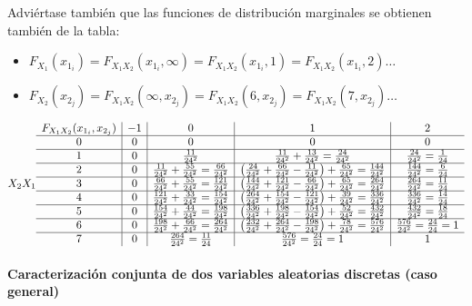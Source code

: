 \documentclass[11pt]{article}
\providecommand{\tightlist}{%
      \setlength{\itemsep}{0pt}\setlength{\parskip}{0pt}}
\begin{document}
Adviértase también que las funciones de distribución marginales se
obtienen también de la tabla:

\begin{itemize}
\tightlist
\item
  \(F_{X_1}(x_{1_i}) = F_{X_1X_2}(x_{1_i}, \infty) = F_{X_1X_2}(x_{1_i}, 1) = F_{X_1X_2}(x_{1_i}, 2)\ldots\)
\item
  \(F_{X_2}(x_{2_j}) = F_{X_1X_2}(\infty, x_{2_j}) = F_{X_1X_2}(6, x_{2_j}) = F_{X_1X_2}(7, x_{2_j})\ldots\)
\end{itemize}

    \[
X_2 \\X_1 \begin{array}{c|c|c|c|c}
F_{X_1X_2}(x_{1_i}, x_{2_j}) & -1 & 0 & 1 & 2\\
\hline
0 & 0 & 0 & 0 & 0 \\
\hline
1 & 0 & \frac{11}{24^2} & \frac{11}{24^2} + \frac{13}{24^2} = \frac{24}{24^2} & \frac{24}{24^2} = \frac{1}{24}\\
\hline
2 & 0 &\frac{11}{24^2} + \frac{55}{24^2} = \frac{66}{24^2} & \left(\frac{24}{24^2} + \frac{66}{24^2} - \frac{11}{24^2}\right) + \frac{65}{24^2} = \frac{144}{24^2} & \frac{144}{24^2} = \frac{6}{24}\\
\hline
3 & 0 & \frac{66}{24^2} + \frac{55}{24^2} = \frac{121}{24^2} & \left(\frac{144}{24^2} + \frac{121}{24^2}- \frac{66}{24^2}\right) + \frac{65}{24^2} = \frac{264}{24^2} & \frac{264}{24^2} =  \frac{11}{24}\\
\hline
4 & 0 & \frac{121}{24^2} + \frac{33}{24^2} = \frac{154}{24^2} & \left(\frac{264}{24^2} + \frac{154}{24^2} - \frac{121}{24^2}\right) + \frac{39}{24^2} = \frac{336}{24^2} & \frac{336}{24^2} = \frac{14}{24}\\
\hline
5 & 0 & \frac{154}{24^2} + \frac{44}{24^2} = \frac{198}{24^2} & \left(\frac{336}{24^2} + \frac{198}{24^2} - \frac{154}{24^2}\right) + \frac{52}{24^2} = \frac{432}{24^2} & \frac{432}{24^2} = \frac{18}{24}\\
\hline
6 & 0 & \frac{198}{24^2} + \frac{66}{24^2} = \frac{264}{24^2} & \left(\frac{232}{24^2} + \frac{264}{24^2} - \frac{198}{24^2}\right) + \frac{78}{24^2} = \frac{576}{24^2} & \frac{576}{24^2} = \frac{24}{24} =1\\
\hline
7 & 0 & \frac{264}{24^2} = \frac{11}{24} & \frac{576}{24^2} = \frac{24}{24}= 1 & 1
\end{array}
\]

    \hypertarget{caracterizaciuxf3n-conjunta-de-dos-variables-aleatorias-discretas-caso-general}{%
\paragraph{Caracterización conjunta de dos variables aleatorias
discretas (caso
general)}\label{caracterizaciuxf3n-conjunta-de-dos-variables-aleatorias-discretas-caso-general}}
\end{document}
